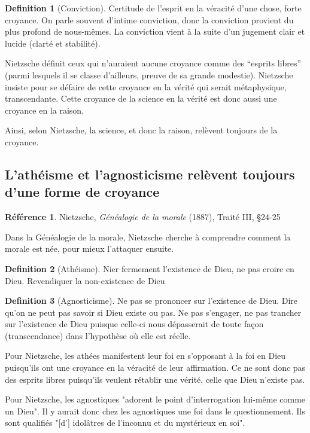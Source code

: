 \documentclass[french]{book}
\theoremstyle{definition}
\newtheorem*{dfn}{Definition}
\newtheorem*{refe}{Référence}
\begin{document}
\begin{dfn}[Conviction]
Certitude de l’esprit en la véracité d’une chose, forte croyance. On parle souvent d’intime conviction, donc la conviction provient du plus profond de nous-mêmes. La conviction vient à la suite d’un jugement clair et lucide (clarté et stabilité).
\end{dfn}


Nietzsche définit ceux qui n’auraient aucune croyance comme des “esprits libres” (parmi lesquels il se classe d’ailleurs, preuve de sa grande modestie).
Nietzsche insiste pour se défaire de cette croyance en la vérité qui serait métaphysique, transcendante. Cette croyance de la science en la vérité est donc aussi une croyance en la raison.

Ainsi, selon Nietzsche, la science, et donc la raison, relèvent toujours de la croyance.

\subsection{L'athéisme et l'agnosticisme relèvent toujours d'une forme de croyance}

\begin{refe}
	Nietzsche, \textit{Généalogie de la morale} (1887), Traité III, §24-25
\end{refe}

Dans la Généalogie de la morale, Nietzsche cherche à comprendre comment la morale est née, pour mieux l'attaquer ensuite.

\begin{dfn}[Athéisme]
Nier fermement l'existence de Dieu, ne pas croire en Dieu. Revendiquer la non-existence de Dieu
\end{dfn}



\begin{dfn}[Agnosticisme] 
Ne pas se prononcer sur l'existence de Dieu. Dire qu'on ne peut pas savoir si Dieu existe ou pas. Ne pas s'engager, ne pas trancher sur l'existence de Dieu puisque celle-ci nous dépasserait de toute façon (transcendance) dans l'hypothèse où elle est réelle.
\end{dfn}


Pour Nietzsche, les athées manifestent leur foi en s'opposant à la foi en Dieu puisqu'ils ont une croyance en la véracité de leur affirmation. Ce ne sont donc pas des esprits libres puisqu'ils veulent rétablir une vérité, celle que Dieu n'existe pas.

Pour Nietzsche, les agnostiques "adorent le point d'interrogation lui-même comme un Dieu". Il y aurait donc chez les agnostiques une foi dans le questionnement. Ils sont qualifiés "[d'] idolâtres de l'inconnu et du mystérieux en soi".
\end{document}
